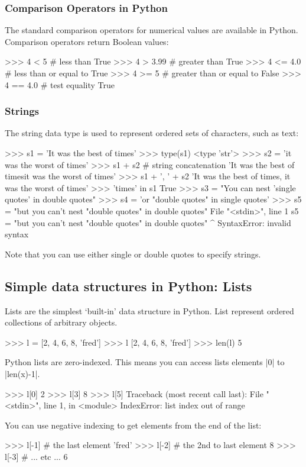\subsubsection{Comparison Operators in Python}

The standard comparison operators for numerical values are available in Python. Comparison operators return Boolean values:
%
\begin{python}
>>> 4 < 5 # less than
True
>>> 4 > 3.99 # greater than
True
>>> 4 <= 4.0 # less than or equal to
True
>>> 4 >= 5 # greater than or equal to
False
>>> 4 == 4.0 # test equality
True
\end{python}


\subsubsection{Strings}
%
The string data type is used to represent ordered sets of characters, such as text:
%
\begin{python}
>>> s1 = 'It was the best of times'
>>> type(s1)
<type 'str'>
>>> s2 = 'it was the worst of times'
>>> s1 + s2  # string concatenation
'It was the best of timesit was the worst of times'
>>> s1 + ', ' + s2
'It was the best of times, it was the worst of times'
>>> 'times' in s1
True
>>> s3 = "You can nest 'single quotes' in double quotes"
>>> s4 = 'or "double quotes" in single quotes'
>>> s5 = "but you can't nest "double quotes" in double quotes"
  File "<stdin>", line 1
    s5 = "but you can't nest "double quotes" in double quotes"
                                   ^
SyntaxError: invalid syntax
\end{python}
%
Note that you can use either single or double quotes to specify strings.

\subsection{Simple data structures in Python: Lists}

Lists are the simplest `built-in' data structure in Python. List
represent ordered collections of arbitrary objects.
%
\begin{python}
>>> l = [2, 4, 6, 8, 'fred']
>>> l
[2, 4, 6, 8, 'fred']
>>> len(l)
5
\end{python}

Python lists are zero-indexed. This means you can access lists elements
|0| to |len(x)-1|.
%
\begin{python}
>>> l[0]
2
>>> l[3]
8
>>> l[5]
Traceback (most recent call last):
  File "<stdin>", line 1, in <module>
IndexError: list index out of range
\end{python}
%
You can use negative indexing to get elements from the end of the list:
\begin{python}
>>> l[-1] # the last element
'fred'
>>> l[-2] # the 2nd to last element
8
>>> l[-3] # ... etc ...
6
\end{python}

